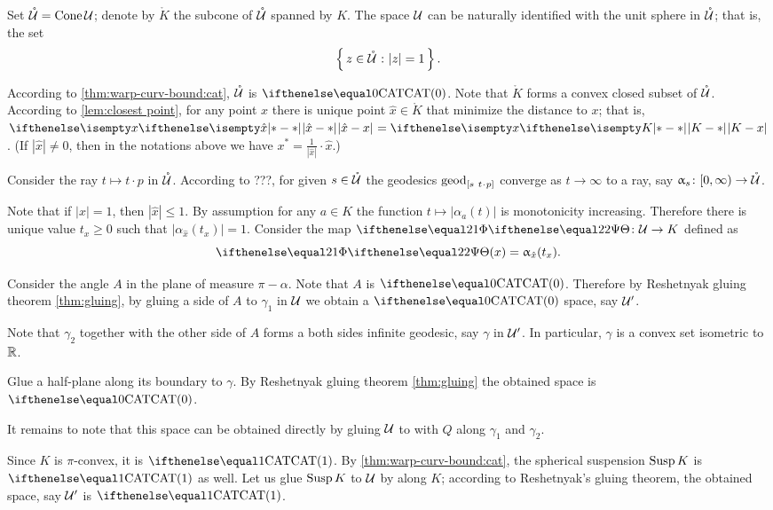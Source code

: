 Set $\mathring{\mathcal{U}}=\mathop{\rm Cone}\nolimits \mathcal{U}$;
denote by $\mathring{K}$ the subcone of $\mathring{\mathcal{U}}$ spanned by $K$.
The space $\mathcal{U}$ can be naturally identified with the unit sphere in $\mathring{\mathcal{U}}$;
that is, the set 
\[\set{z\in \mathring{\spc{U}}}{|z|=1}.\]

According to \ref{thm:warp-curv-bound:cat}, $\mathring{\mathcal{U}}$ is $\CAT0$.
Note that $\mathring{K}$ forms a convex closed subset of $\mathring{\mathcal{U}}$.
According to \ref{lem:closest point}, for any point $x$ there is unique point $\hat x\in \mathring{K}$
that minimize the distance to $x$;
that is, $\dist{\hat x}{x}{}=\dist{K}{x}{}$.
(If $|\hat x|\ne0$, then in the notations above we have
$x^*=\tfrac1{|\hat x|}\cdot\hat x$.)

Consider the ray $t\mapsto t\cdot p$ in  $\mathring{\mathcal{U}}$.
According to ???, %
for given $s\in \mathring{\spc{U}}$
the geodesics $\geod_{[s\ t\cdot p]}$ converge as $t\to\infty$ to a ray, 
say $\alpha_s\:[0,\infty)\to \mathring{\spc{U}}$.



Note that if $|x|=1$, then $|\hat x|\le 1$.
By assumption for any $a\in K$ the function $t\mapsto |\alpha_a(t)|$ is monotonicity increasing.
Therefore there is unique value $t_x\ge 0$ such that
$|\alpha_{\hat x}(t_x)|=1$.
Consider the map $\map[2]\:\spc{U}\to K$
defined as 
\[\map[2](x)=\alpha_{\hat x}(t_x).\]

Consider the angle $A$ in the plane of measure $\pi-\alpha$.
Note that $A$ is $\CAT0$.
Therefore by Reshetnyak gluing theorem \ref{thm:gluing},
by gluing a side of $A$ to $\gamma_1$ in $\mathcal{U}$ we obtain a $\CAT0$ space, say $\mathcal{U}'$.

Note that $\gamma_2$ together with the other side of $A$ forms a both sides infinite geodesic, say $\gamma$ in $\mathcal{U}'$.
In particular, $\gamma$ is a convex set isometric to $\mathbb{R}$.

Glue a half-plane along its boundary to $\gamma$.
By Reshetnyak gluing theorem \ref{thm:gluing} the obtained space is $\CAT0$.

It remains to note that this space can be obtained directly by gluing $\mathcal{U}$ to with $Q$ along $\gamma_1$ and $\gamma_2$.

Since $K$ is $\pi$-convex, it is $\CAT1$.
By \ref{thm:warp-curv-bound:cat}, the spherical suspension $\mathop{\rm Susp}\nolimits K$ is $\CAT1$ as well.
Let us glue $\mathop{\rm Susp}\nolimits K$ to $\mathcal{U}$ by along $K$;
according to Reshetnyak's gluing theorem, the obtained space, say $\mathcal{U}'$ is $\CAT1$.

